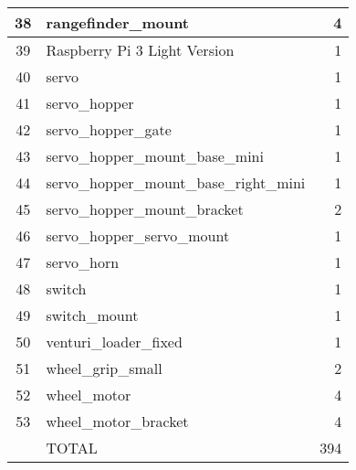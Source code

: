 \begin{longtable}{clr}
	38       & rangefinder\_mount                      & 4                        \\ \hline
	39       & Raspberry Pi 3 Light Version            & 1                        \\ \hline
	40       & servo                                   & 1                        \\ \hline
	41       & servo\_hopper                           & 1                        \\ \hline
	42       & servo\_hopper\_gate                     & 1                        \\ \hline
	43       & servo\_hopper\_mount\_base\_mini        & 1                        \\ \hline
	44       & servo\_hopper\_mount\_base\_right\_mini & 1                        \\ \hline
	45       & servo\_hopper\_mount\_bracket           & 2                        \\ \hline
	46       & servo\_hopper\_servo\_mount             & 1                        \\ \hline
	47       & servo\_horn                             & 1                        \\ \hline
	48       & switch                                  & 1                        \\ \hline
	49       & switch\_mount                           & 1                        \\ \hline
	50       & venturi\_loader\_fixed                  & 1                        \\ \hline
	51       & wheel\_grip\_small                      & 2                        \\ \hline
	52       & wheel\_motor                            & 4                        \\ \hline
	53       & wheel\_motor\_bracket                   & 4                        \\ \hline
			 & TOTAL                                   & 394                      \\ \hline
\end{longtable}
